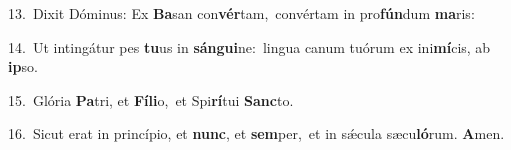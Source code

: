 {\numbfont\textcolor{\numbcolor}{13.}}~Dixit Dóminus: Ex \textbf{Ba}\-san con\-\textbf{vér}\-tam,~\star convértam in pro\-\textbf{fún}\-dum \textbf{ma}\-ris:\par
{\numbfont\textcolor{\numbcolor}{14.}}~Ut intingátur pes \textbf{tu}\-us in \textbf{sán}\-\textbf{gui}ne:~\star lingua canum tuórum ex ini\-\textbf{mí}\-cis, ab \textbf{ip}\-so.\par
{\numbfont\textcolor{\numbcolor}{15.}}~Glória \textbf{Pa}\-tri, et \textbf{Fí}\-\textbf{li}o,~\star et Spi\-\textbf{rí}\-tui \textbf{Sanc}\-to.\par
{\numbfont\textcolor{\numbcolor}{16.}}~Sicut erat in princípio, et \textbf{nunc}\-, et \textbf{sem}\-per,~\star et in sǽcula sæcu\-\textbf{ló}\-rum. \textbf{A}\-men.\par
